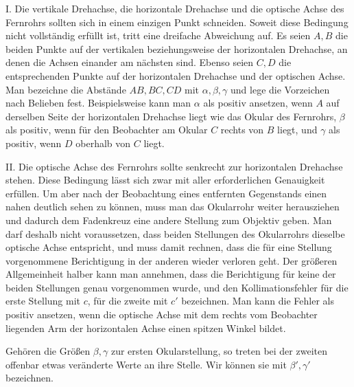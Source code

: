 I. Die vertikale Drehachse, die horizontale Drehachse und die optische Achse des Fernrohrs sollten sich in einem einzigen Punkt schneiden. Soweit diese Bedingung nicht vollständig erfüllt ist, tritt eine dreifache Abweichung auf. Es seien $A,B$ die beiden Punkte auf der vertikalen beziehungsweise der horizontalen Drehachse, an denen die Achsen einander am nächsten sind. Ebenso seien $C,D$ die entsprechenden Punkte auf der horizontalen Drehachse und der optischen Achse. Man bezeichne die Abstände $AB,BC,CD$ mit $\alpha,\beta,\gamma$ und lege die Vorzeichen nach Belieben fest. Beispielsweise kann man $\alpha$ als positiv ansetzen, wenn $A$ auf derselben Seite der horizontalen Drehachse liegt wie das Okular des Fernrohrs, $\beta$ als positiv, wenn für den Beobachter am Okular $C$ rechts von $B$ liegt, und $\gamma$ als positiv, wenn $D$ oberhalb von $C$ liegt.

II. Die optische Achse des Fernrohrs sollte senkrecht zur horizontalen Drehachse stehen. Diese Bedingung lässt sich zwar mit aller erforderlichen Genauigkeit erfüllen. Um aber nach der Beobachtung eines entfernten Gegenstands einen nahen deutlich sehen zu können, muss man das Okularrohr weiter herausziehen und dadurch dem Fadenkreuz eine andere Stellung zum Objektiv geben. Man darf deshalb nicht voraussetzen, dass beiden Stellungen des Okularrohrs dieselbe optische Achse entspricht, und muss damit rechnen, dass die für eine Stellung vorgenommene Berichtigung in der anderen wieder verloren geht. Der größeren Allgemeinheit halber kann man annehmen, dass die Berichtigung für keine der beiden Stellungen genau vorgenommen wurde, und den Kollimationsfehler für die erste Stellung mit $c$, für die zweite mit $c'$ bezeichnen. Man kann die Fehler als positiv ansetzen, wenn die optische Achse mit dem rechts vom Beobachter liegenden Arm der horizontalen Achse einen spitzen Winkel bildet.

Gehören die Größen $\beta,\gamma$ zur ersten Okularstellung, so treten bei der zweiten offenbar etwas veränderte Werte an ihre Stelle. Wir können sie mit $\beta',\gamma'$ bezeichnen.

